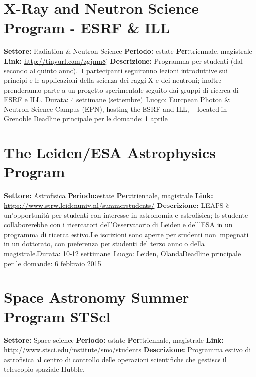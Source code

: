 \documentclass[a4paper,10pt]{article}
\begin{document}
\section{	X-Ray and Neutron Science Program - ESRF & ILL}	
\textbf{Settore:} Radiation & Neutron Science\newline
\textbf{Periodo:} estate\newline
\textbf{Per:}triennale, magistrale\newline
\textbf{Link:} \url{http://tinyurl.com/zgjmn8j} \newline
\textbf{Descrizione:}	Programma per studenti (dal secondo al quinto anno). I partecipanti seguiranno lezioni introduttive sui principi e le applicazioni della scienza dei raggi X e dei neutroni; inoltre prenderanno parte a un progetto sperimentale seguito dai gruppi di ricerca di ESRF e ILL. Durata: 4 settimane (settembre) Luogo: European Photon & Neutron Science Campus (EPN), hosting the ESRF and ILL,   located in Grenoble Deadline principale per le domande: 1 aprile

\section{	The Leiden/ESA Astrophysics Program}
\textbf{Settore:} Astrofisica\newline
\textbf{Periodo:}estate \newline
\textbf{Per:}triennale, magistrale\newline
\textbf{Link:} \url{https://www.strw.leidenuniv.nl/summerstudents/} \newline
\textbf{Descrizione:} LEAPS è un’opportunità per studenti con interesse in astronomia e astrofisica; lo studente collaborerebbe con i ricercatori dell’Osservatorio di Leiden e dell’ESA in un programma di ricerca estivo.Le iscrizioni sono aperte per studenti non impegnati in un dottorato, con preferenza per studenti del terzo anno o della magistrale.Durata: 10-12 settimane Luogo: Leiden, OlandaDeadline principale per le domande: 6 febbraio 2015	

\section{	Space Astronomy Summer Program STScl	}
\textbf{Settore:} Space science\newline
\textbf{Periodo:} estate\newline
\textbf{Per:}triennale, magistrale\newline
\textbf{Link:} \url{http://www.stsci.edu/institute/smo/students} \newline
\textbf{Descrizione:}  	Programma estivo di astrofisica al centro di controllo delle operazioni scientifiche che gestisce il telescopio spaziale Hubble.	
\end{document}
